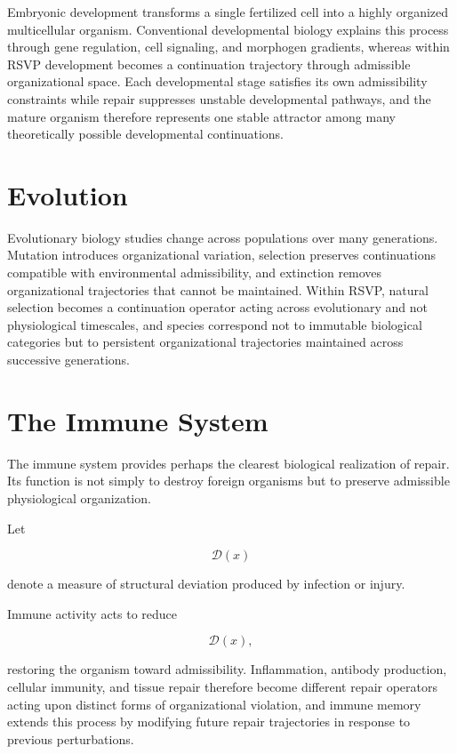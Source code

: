 \documentclass[11pt,oneside]{book}
\numberwithin{equation}{chapter}
\theoremstyle{definition}
\theoremstyle{plain}
\begin{document}
Embryonic development transforms a single fertilized cell into a highly organized multicellular organism. Conventional developmental biology explains this process through gene regulation, cell signaling, and morphogen gradients, whereas within RSVP development becomes a continuation trajectory through admissible organizational space. Each developmental stage satisfies its own admissibility constraints while repair suppresses unstable developmental pathways, and the mature organism therefore represents one stable attractor among many theoretically possible developmental continuations.

\section{Evolution}

Evolutionary biology studies change across populations over many generations. Mutation introduces organizational variation, selection preserves continuations compatible with environmental admissibility, and extinction removes organizational trajectories that cannot be maintained. Within RSVP, natural selection becomes a continuation operator acting across evolutionary and not physiological timescales, and species correspond not to immutable biological categories but to persistent organizational trajectories maintained across successive generations.

\section{The Immune System}

The immune system provides perhaps the clearest biological realization of repair. Its function is not simply to destroy foreign organisms but to preserve admissible physiological organization.

Let

\[
\mathcal D(x)
\]

denote a measure of structural deviation produced by infection or injury.

Immune activity acts to reduce

\[
\mathcal D(x),
\]

restoring the organism toward admissibility. Inflammation, antibody production, cellular immunity, and tissue repair therefore become different repair operators acting upon distinct forms of organizational violation, and immune memory extends this process by modifying future repair trajectories in response to previous perturbations.
\end{document}
